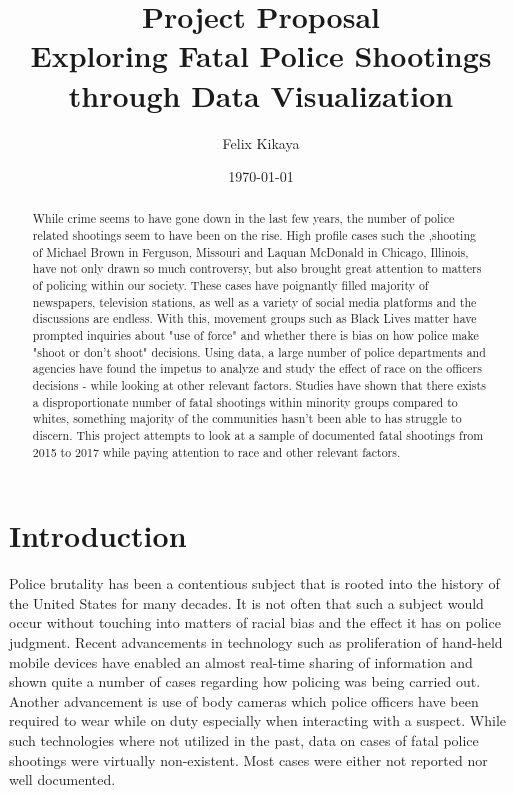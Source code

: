 \documentclass[a4paper,12pt]{article}
\title{\textbf{Project Proposal\\
\large{Exploring Fatal Police Shootings through Data Visualization}
}}
\author{Felix Kikaya}
\date{\today}
\begin{document}
\maketitle

\begin{abstract}
While crime seems to have gone down in the last few years, the number of police related shootings seem to have been on the rise. High profile cases such the \cite{ferguson},shooting of Michael Brown in Ferguson, Missouri and Laquan McDonald in Chicago, Illinois, have not only drawn so much controversy, but also brought great attention to matters of policing within our society. These cases have poignantly filled majority of newspapers, television stations, as well as a variety of social media platforms and the discussions are endless. With this, movement groups such as Black Lives matter have prompted inquiries about "use of force" and whether there is bias on how police make "shoot or don't shoot" decisions. Using data, a large number of police departments and agencies have found the impetus to analyze and study the effect of race on the officers decisions - while looking at other relevant factors. Studies have shown that there exists a disproportionate number of fatal shootings within minority groups compared to whites, something majority of the communities hasn't been able to has struggle to discern. This project attempts to look at a sample of documented fatal shootings from 2015 to 2017 while paying attention to race and other relevant factors. 
\end{abstract}
\section*{Introduction}
Police brutality has been a contentious subject that is rooted into the history of the United States for many decades. It is not often that such a subject would occur without touching into matters of racial bias and the effect it has on police judgment. Recent advancements in technology such as proliferation of hand-held mobile devices have enabled an almost real-time sharing of information and shown quite a number of cases regarding how policing was being carried out. Another advancement is use of body cameras which police officers have been required to wear while on duty especially when interacting with a suspect. While such technologies where not utilized in the past, data on cases of fatal police shootings were virtually non-existent. Most cases were either not reported nor well documented. 
 
\end{document}
